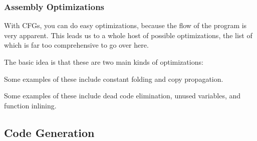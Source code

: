 \documentclass[aspectratio=169]{beamer}
\begin{document}
\begin{frame}[fragile]
  \frametitle{Assembly Optimizations}

  With CFGs, you can do easy optimizations, because the flow of the program
  is very apparent. This leads us to a whole host of possible optimizations,
  the list of which is far too comprehensive to go over here.

  \pause
  \vspace{\fill}

  The basic idea is that these are two main kinds of optimizations:

  \pause
  \vspace{\fill}


  Some examples of these include constant folding and copy propagation.

  \pause
  \vspace{\fill}


  Some examples of these include dead code elimination, unused variables,
  and function inlining.
\end{frame}

\subsection{\color{presentColor}Code Generation}
\end{document}
